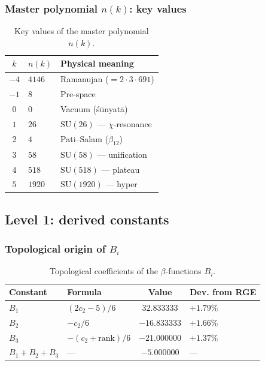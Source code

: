 \documentclass[11pt,a4paper]{article}
\newcommand{\SU}{\ensuremath{\mathrm{SU}}}
\theoremstyle{definition}
\begin{document}
\subsubsection{Master polynomial \texorpdfstring{$n(k)$}{n(k)}: key values}

\begin{table}[ht]
\centering
\caption{Key values of the master polynomial \texorpdfstring{$n(k)$}{n(k)}.}
\label{tab:app-master-poly}
\begin{tabular}{cll}
\toprule
$k$ & $n(k)$ & Physical meaning \\
\midrule
$-4$ & $4146$ & Ramanujan ($= 2 \cdot 3 \cdot 691$) \\
$-1$ & $8$ & Pre-space \\
$0$  & $0$ & Vacuum (śūnyatā) \\
$1$  & $26$ & $\SU(26)$ — $\chi$-resonance \\
$2$  & $4$ & Pati--Salam ($\beta_{12}$) \\
$3$  & $58$ & $\SU(58)$ — unification \\
$4$  & $518$ & $\SU(518)$ — plateau \\
$5$  & $1920$ & $\SU(1920)$ — hyper \\
\bottomrule
\end{tabular}
\end{table}

\subsection{Level 1: derived constants}
\label{app:level-1}

\subsubsection{Topological origin of \texorpdfstring{$B_i$}{B\_i}}

\begin{table}[ht]
\centering
\caption{Topological coefficients of the \texorpdfstring{$\beta$}{}-functions \texorpdfstring{$B_i$}{B\_i}.}
\label{tab:app-bi}
\begin{tabular}{llcl}
\toprule
Constant & Formula & Value & Dev. from RGE \\
\midrule
$B_1$ & $(2c_2 - 5)/6$ & $32.833333$ & $+1.79\%$ \\
$B_2$ & $-c_2/6$ & $-16.833333$ & $+1.66\%$ \\
$B_3$ & $-(c_2 + \text{rank})/6$ & $-21.000000$ & $+1.37\%$ \\
$B_1 + B_2 + B_3$ & — & $-5.000000$ & — \\
\bottomrule
\end{tabular}
\end{table}
\end{document}

